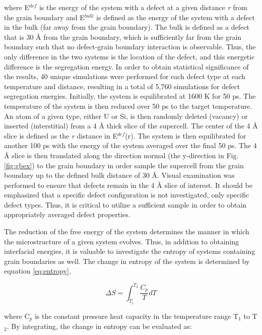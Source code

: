 \documentclass[review]{elsarticle}
\begin{document}
where E$^{def}$ is the energy of the system with a defect at a given distance \textit{r} from the grain boundary and E$^{bulk}$ is defined as the energy of the system with a defect in the bulk (far away from the grain boundary). The bulk is defined as a defect that is 30 {\AA} from the grain boundary, which is sufficiently far from the grain boundary such that no defect-grain boundary interaction is observable. Thus, the only difference in the two systems is the location of the defect, and this energetic difference is the segregation energy. In order to obtain statistical significance of the results, 40 unique simulations were performed for each defect type at each temperature and distance, resulting in a total of 5,760 simulations for defect segregation energies. Initially, the system is equilibrated at 1600 K for 50 ps. The temperature of the system is then reduced over 50 ps to the target temperature. An atom of a given type, either U or Si, is then randomly deleted (vacancy) or inserted (interstitial) from a 4 {\AA} thick slice of the supercell. The center of the 4 {\AA} slice is defined as the \textit{r} distance in E$^{def}$(r). The system is then equilibrated for another 100 ps with the energy of the system averaged over the final 50 ps. The 4 {\AA} slice is then translated along the direction normal (the y-direction in Fig. \ref{fig:gbex}) to the grain boundary in order sample the supercell from the grain boundary up to the defined bulk distance of 30 {\AA}. Visual examination was performed to ensure that defects remain in the 4 {\AA} slice of interest. It should be emphasized that a specific defect configuration is not investigated, only specific defect types. Thus, it is critical to utilize a sufficient sample in order to obtain appropriately averaged defect properties.

The reduction of the free energy of the system determines the manner in which the microstructure of a given system evolves. Thus, in addition to obtaining interfacial energies, it is valuable to investigate the entropy of systems containing grain boundaries as well. The change in entropy of the system is determined by equation \ref{eq:entropy},

\begin{equation}
\label{eq:entropy}
\Delta S = \int_{T_{1}}^{T_{2}} \frac{C_{p}}{T} dT
\end{equation}

where C$_{p}$ is the constant pressure heat capacity in the temperature range T$_{1}$ to T$_{2}$. By integrating, the change in entropy can be evaluated as:
\end{document}
